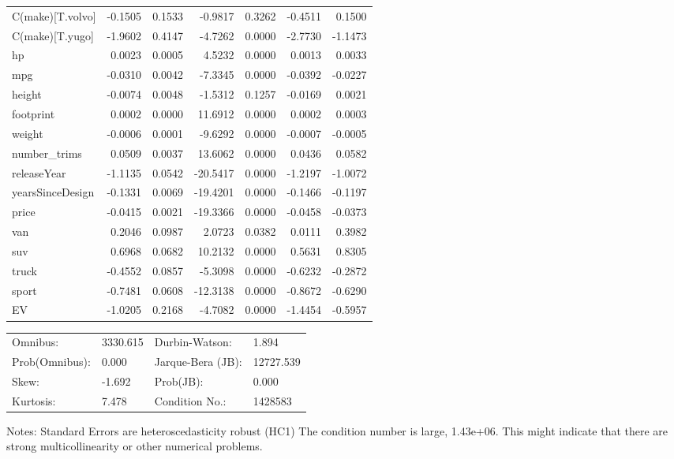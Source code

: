 \begin{table}
\begin{center}
\begin{tabular}{lrrrrrr}
C(make)[T.volvo]         & -0.1505 &   0.1533 &  -0.9817 &      0.3262 & -0.4511 &  0.1500  \\
C(make)[T.yugo]          & -1.9602 &   0.4147 &  -4.7262 &      0.0000 & -2.7730 & -1.1473  \\
hp                       &  0.0023 &   0.0005 &   4.5232 &      0.0000 &  0.0013 &  0.0033  \\
mpg                      & -0.0310 &   0.0042 &  -7.3345 &      0.0000 & -0.0392 & -0.0227  \\
height                   & -0.0074 &   0.0048 &  -1.5312 &      0.1257 & -0.0169 &  0.0021  \\
footprint                &  0.0002 &   0.0000 &  11.6912 &      0.0000 &  0.0002 &  0.0003  \\
weight                   & -0.0006 &   0.0001 &  -9.6292 &      0.0000 & -0.0007 & -0.0005  \\
number\_trims            &  0.0509 &   0.0037 &  13.6062 &      0.0000 &  0.0436 &  0.0582  \\
releaseYear              & -1.1135 &   0.0542 & -20.5417 &      0.0000 & -1.2197 & -1.0072  \\
yearsSinceDesign         & -0.1331 &   0.0069 & -19.4201 &      0.0000 & -0.1466 & -0.1197  \\
price                    & -0.0415 &   0.0021 & -19.3366 &      0.0000 & -0.0458 & -0.0373  \\
van                      &  0.2046 &   0.0987 &   2.0723 &      0.0382 &  0.0111 &  0.3982  \\
suv                      &  0.6968 &   0.0682 &  10.2132 &      0.0000 &  0.5631 &  0.8305  \\
truck                    & -0.4552 &   0.0857 &  -5.3098 &      0.0000 & -0.6232 & -0.2872  \\
sport                    & -0.7481 &   0.0608 & -12.3138 &      0.0000 & -0.8672 & -0.6290  \\
EV                       & -1.0205 &   0.2168 &  -4.7082 &      0.0000 & -1.4454 & -0.5957  \\
\hline
\end{tabular}
\end{center}

\begin{center}
\begin{tabular}{llll}
\hline
Omnibus:       & 3330.615 & Durbin-Watson:    & 1.894      \\
Prob(Omnibus): & 0.000    & Jarque-Bera (JB): & 12727.539  \\
Skew:          & -1.692   & Prob(JB):         & 0.000      \\
Kurtosis:      & 7.478    & Condition No.:    & 1428583    \\
\hline
\end{tabular}
\end{center}
\end{table}
\bigskip
Notes: \newline 
[1] Standard Errors are heteroscedasticity robust (HC1) \newline 
[2] The condition number is large, 1.43e+06. This might indicate                that there are strong multicollinearity or other numerical                problems.